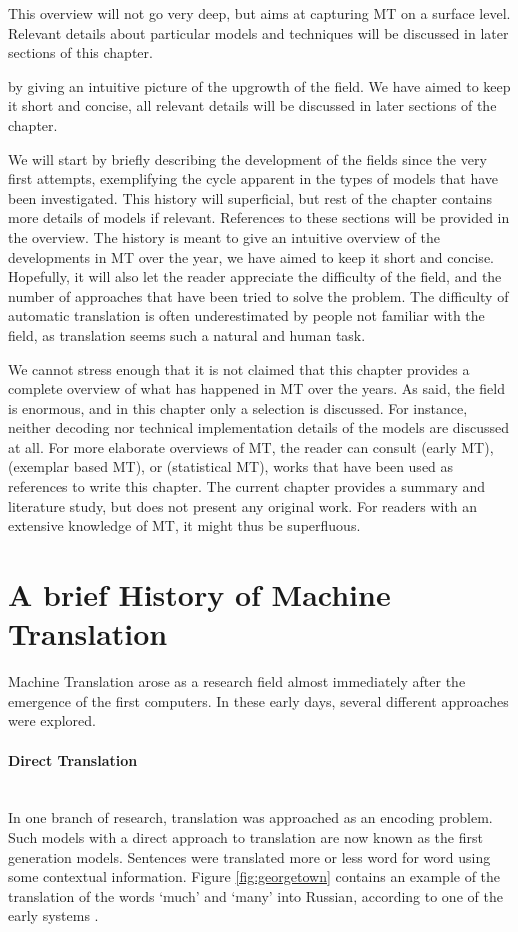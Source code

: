 \documentclass{report}
\newcommand{\myparagraph}[1]{\paragraph{#1}\mbox{}\\}
\theoremstyle{definition}
\theoremstyle{plain}
\begin{document}
This overview will not go very deep, but aims at capturing MT on a surface level. Relevant details about particular models and techniques will be discussed in later sections of this chapter. 


 by giving an intuitive picture of the upgrowth of the field. We have aimed to keep it short and concise, all relevant details will be discussed in later sections of the chapter. 

We will start by briefly describing the development of the fields since the very first attempts, exemplifying the cycle apparent in the types of models that have been investigated. This history will superficial, but rest of the chapter contains more details of models if relevant. References to these sections will be provided in the overview. The history is meant to give an intuitive overview of the developments in MT over the year, we have aimed to keep it short and concise. Hopefully, it will also let the reader appreciate the difficulty of the field, and the number of approaches that have been tried to solve the problem. The difficulty of automatic translation is often underestimated by people not familiar with the field, as translation seems such a natural and human task.

We cannot stress enough that it is not claimed that this chapter provides a complete overview of what has happened in MT over the years. As said, the field is enormous, and in this chapter only a selection is discussed. For instance, neither decoding nor technical implementation details of the models are discussed at all. For more elaborate overviews of MT, the reader can consult \cite{hutchins1992introduction} (early MT), \cite{somers1999review} (exemplar based MT), \cite{koehn2008statistical} or \cite{wu2005mt} (statistical MT), works that have been used as references to write this chapter. The current chapter provides a summary and literature study, but does not present any original work. For readers with an extensive knowledge of MT, it might thus be superfluous.


\section{A brief History of Machine Translation}
\label{sec:overview}

Machine Translation arose as a research field almost immediately after the emergence of the first computers. In these early days, several different approaches were explored. 

\myparagraph{Direct Translation}
In one branch of research, translation was approached as an encoding problem. Such models with a direct approach to translation are now known as the first generation models. Sentences were translated more or less word for word using some contextual information. Figure \ref{fig:georgetown} contains an example of the translation of the words `much' and `many' into Russian, according to one of the early systems \citep{dostert1955georgetown}.
\end{document}
